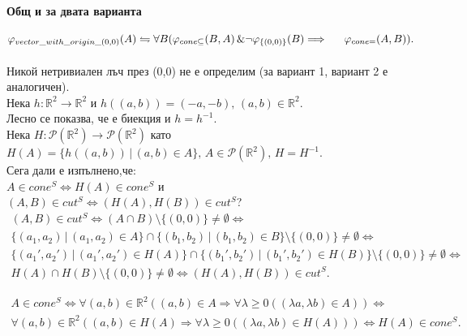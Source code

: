 \documentclass[12pt]{article}
\begin{document}
\paragraph{\hspace{0.5em} Общ и за двата варианта}
\begin{addmargin}[1em]{2em}
$\varphi_{vector\_with\_origin\_(0,0)}(A) \leftrightharpoons \forall B (\varphi_{cone\subseteq}(B, A)\,\&\neg \varphi_{\{(0,0)\}}(B) \Longrightarrow \\\indent\varphi_{cone=}(A, B)).$\\\\
Никой нетривиален лъч през (0,0) не е определим (за вариант 1, вариант 2 е аналогичен).\\
Нека $h:\mathbb{R}^2 \rightarrow \mathbb{R}^2$ и 
$h((a,b)) = (-a,-b),\, (a,b) \in \mathbb{R}^2$.\\
Лесно се показва, че е биекция и $h=h^{-1}$.\\
Нека $H:\mathcal{P}(\mathbb{R}^2)\rightarrow \mathcal{P}(\mathbb{R}^2)$ като $H(A) = \{h((a,b))\,|\,(a,b) \in A\},\,A \in \mathcal{P}(\mathbb{R}^2),\, H = H^{-1}$.\\
Сега дали е изпълнено,че:\\
$A\in cone^S \iff H(A) \in cone^S$ и \\
$(A,B) \in cut^S \iff (H(A), H(B)) \in cut^S$?\\

\begin{eqnarray*}
    (A,B) \in cut^S \iff (A\cap B)\setminus\{(0,0)\} \neq \emptyset \iff \\
    \{(a_{1},a_{2})\,|\,(a_{1},a_{2}) \in A\} \cap \{(b_{1},b_{2})\,|\,(b_{1},b_{2}) \in B\}\setminus\{(0,0)\} \neq \emptyset \iff \\
    \{(a_{1}',a_{2}')\,|\,(a_{1}',a_{2}') \in H(A)\} \cap \{(b_{1}',b_{2}')\,|\,(b_{1}',b_{2}') \in H(B)\}\setminus\{(0,0)\} \neq \emptyset \iff \\
    H(A) \cap H(B) \setminus\{(0,0)\}\neq \emptyset \iff (H(A),H(B)) \in cut^S.
\end{eqnarray*}

\begin{eqnarray*}
    A \in cone^S \iff \forall (a,b) \in \mathbb{R}^2 ((a,b)\in A \Rightarrow \forall \lambda\ge 0((\lambda a,\lambda b)\in A)) \iff \\ \forall (a,b) \in \mathbb{R}^2 ((a,b)\in H(A) \Rightarrow \forall \lambda\ge 0((\lambda a,\lambda b)\in H(A))) \iff H(A) \in  cone^S.
\end{eqnarray*}
\end{addmargin}
\end{document}
